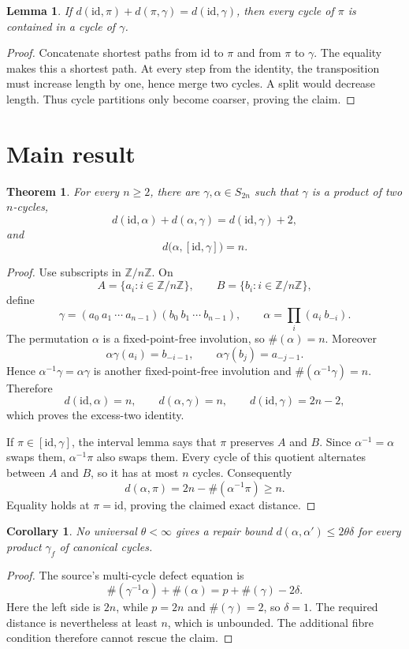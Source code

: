 \documentclass[11pt]{article}
\newtheorem*{theorem*}{Theorem}
\newtheorem*{lemma*}{Lemma}
\newtheorem*{corollary*}{Corollary}
\newcommand{\id}{\mathrm{id}}
\newcommand{\cyc}[1]{\#(#1)}
\newcommand{\dist}{d}
\begin{document}
\begin{lemma*}
If \(\dist(\id,\pi)+\dist(\pi,\gamma)=\dist(\id,\gamma)\), then every cycle
of \(\pi\) is contained in a cycle of \(\gamma\).
\end{lemma*}
\begin{proof}
Concatenate shortest paths from \(\id\) to \(\pi\) and from \(\pi\) to
\(\gamma\). The equality makes this a shortest path. At every step from the
identity, the transposition must increase length by one, hence merge two
cycles. A split would decrease length. Thus cycle partitions only become
coarser, proving the claim.
\end{proof}

\section*{Main result}

\begin{theorem*}
For every \(n\geq2\), there are \(\gamma,\alpha\in S_{2n}\) such that
\(\gamma\) is a product of two \(n\)-cycles,
\[
 \dist(\id,\alpha)+\dist(\alpha,\gamma)
 =\dist(\id,\gamma)+2,
\]
and
\[
 \dist\bigl(\alpha,[\id,\gamma]\bigr)=n.
\]
\end{theorem*}

\begin{proof}
Use subscripts in \(\mathbb Z/n\mathbb Z\). On
\[
 A=\{a_i:i\in\mathbb Z/n\mathbb Z\},\qquad
 B=\{b_i:i\in\mathbb Z/n\mathbb Z\},
\]
define
\[
 \gamma=(a_0\ a_1\ \cdots\ a_{n-1})
        (b_0\ b_1\ \cdots\ b_{n-1}),\qquad
 \alpha=\prod_i(a_i\ b_{-i}).
\]
The permutation \(\alpha\) is a fixed-point-free involution, so
\(\cyc{\alpha}=n\). Moreover
\[
 \alpha\gamma(a_i)=b_{-i-1},\qquad
 \alpha\gamma(b_j)=a_{-j-1}.
\]
Hence \(\alpha^{-1}\gamma=\alpha\gamma\) is another fixed-point-free
involution and \(\cyc{\alpha^{-1}\gamma}=n\). Therefore
\[
 \dist(\id,\alpha)=n,\qquad
 \dist(\alpha,\gamma)=n,\qquad
 \dist(\id,\gamma)=2n-2,
\]
which proves the excess-two identity.

If \(\pi\in[\id,\gamma]\), the interval lemma says that \(\pi\) preserves
\(A\) and \(B\). Since \(\alpha^{-1}=\alpha\) swaps them,
\(\alpha^{-1}\pi\) also swaps them. Every cycle of this quotient alternates
between \(A\) and \(B\), so it has at most \(n\) cycles. Consequently
\[
 \dist(\alpha,\pi)=2n-\cyc{\alpha^{-1}\pi}\geq n.
\]
Equality holds at \(\pi=\id\), proving the claimed exact distance.
\end{proof}

\begin{corollary*}
No universal \(\theta<\infty\) gives a repair bound
\(\dist(\alpha,\alpha')\leq2\theta\delta\) for every product
\(\gamma_f\) of canonical cycles.
\end{corollary*}
\begin{proof}
The source's multi-cycle defect equation is
\[
 \cyc{\gamma^{-1}\alpha}+\cyc{\alpha}
 =p+\cyc{\gamma}-2\delta.
\]
Here the left side is \(2n\), while \(p=2n\) and \(\cyc{\gamma}=2\), so
\(\delta=1\). The required distance is nevertheless at least \(n\), which is
unbounded. The additional fibre condition therefore cannot rescue the claim.
\end{proof}
\end{document}
